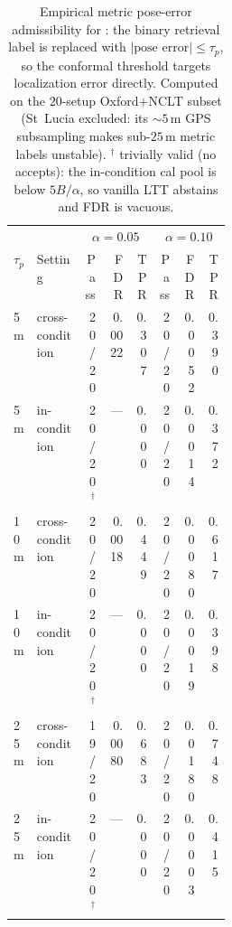 \begin{table}[t]
\centering
\caption{Empirical metric pose-error admissibility for \method: the binary retrieval label is replaced with $|\text{pose error}| \leq \tau_p$, so the conformal threshold targets localization error directly. Computed on the $20$-setup Oxford$+$NCLT subset (St~Lucia excluded: its $\sim 5$\,m GPS subsampling makes sub-$25$\,m metric labels unstable). $^\dagger$ trivially valid (no accepts): the in-condition cal pool is below $5B/\alpha$, so vanilla LTT abstains and FDR is vacuous.}
\label{tab:pose}
\scriptsize
\setlength{\tabcolsep}{3pt}
\begin{tabular}{p{0.06\linewidth}p{0.22\linewidth} rrr rrr}
\toprule
& & \multicolumn{3}{c}{$\alpha = 0.05$} & \multicolumn{3}{c}{$\alpha = 0.10$} \\
\cmidrule(lr){3-5}\cmidrule(lr){6-8}
$\tau_p$ & Setting & Pass & FDR & TPR & Pass & FDR & TPR \\
\midrule
  5\,m & cross-condition & 20/20 & 0.0022 & 0.307 & 20/20 & 0.0052 & 0.390 \\
  5\,m & in-condition & 20/20$^\dagger$ & — & 0.000 & 20/20 & 0.0014 & 0.372 \\
  10\,m & cross-condition & 20/20 & 0.0018 & 0.449 & 20/20 & 0.0080 & 0.617 \\
  10\,m & in-condition & 20/20$^\dagger$ & — & 0.000 & 20/20 & 0.0019 & 0.398 \\
  25\,m & cross-condition & 19/20 & 0.0080 & 0.683 & 20/20 & 0.0180 & 0.748 \\
  25\,m & in-condition & 20/20$^\dagger$ & — & 0.000 & 20/20 & 0.0003 & 0.415 \\
\bottomrule
\end{tabular}
\end{table}
